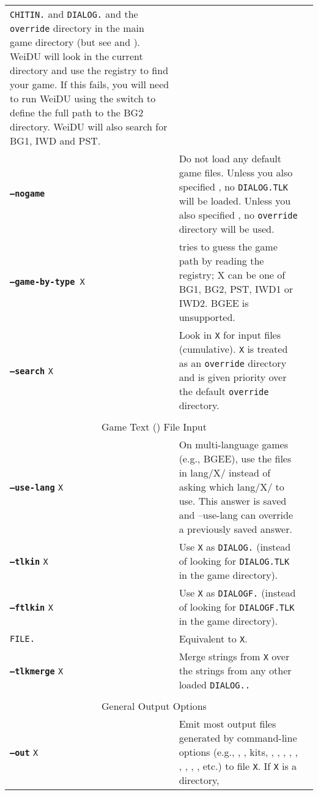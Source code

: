 \documentclass{article}
\def\ttref#1{\ahrefloc{#1}{\tt #1}}
\def\DEFINE#1{{\tt \bf #1}\label{#1}\index{#1}}
\def\t#1{{\tt #1}}
\begin{document}
\begin{tabular}{lp{10in}|p{10in}}
{\tt CHITIN.}\ttref{KEY} and {\tt DIALOG.}\ttref{TLK} and the \t{override}
directory in the main game directory (but see \ttref{--tlkin} and
\ttref{--search}). WeiDU will look in the current directory and use the
registry to find your game. If this fails, you will need to run WeiDU using
the \ttref{--game} switch to define the full path to the BG2 directory.
WeiDU will also search for BG1, IWD and PST. \\
\DEFINE{--nogame}  & Do not
load any default game files. Unless you also specified \ttref{--tlkin}, no
\t{DIALOG.TLK} will be loaded. Unless you also specified \ttref{--search},
no \t{override} directory will be used. \\
{\tt \DEFINE{--game-by-type} X} & tries to guess the game path by reading
the registry; X can be one of BG1, BG2, PST, IWD1 or IWD2. BGEE is unsupported.
\\
\DEFINE{--search} \t{X}	& Look in {\tt X} for input files (cumulative).
\t{X} is treated as an \t{override} directory and is given priority over
the default \t{override} directory. \\
\\
\multicolumn{2}{c}{ \color{red} Game Text (\ttref{TLK}) File Input} \\
\DEFINE{--use-lang} \t{X} & On multi-language games (e.g., BGEE), use the files
in lang/X/ instead of asking which lang/X/ to use. This answer is saved
and --use-lang can override a previously saved answer.\\
\DEFINE{--tlkin} \t{X} & Use {\tt X} as {\tt DIALOG.}\ttref{TLK} (instead
of looking for \t{DIALOG.TLK} in the game directory). \\
\DEFINE{--ftlkin} \t{X} & Use {\tt X} as {\tt DIALOGF.}\ttref{TLK} (instead
of looking for \t{DIALOGF.TLK} in the game directory). \\
\tt{FILE.}\ttref{TLK} & Equivalent to \ttref{--tlkin} \t{X}. \\
\DEFINE{--tlkmerge} \t{X}	& Merge strings from {\tt X} over the strings from any other loaded {\tt \t{DIALOG.}\ttref{TLK}.} \\
\\
\multicolumn{2}{c}{ \color{red} General Output Options} \\
\DEFINE{--out} \t{X} &	Emit most output files generated by command-line
options (e.g., \ttref{D}, \ttref{DLG}, kits, \ttref{--biff-get},
\ttref{BAF}, \ttref{BCS}, \ttref{--automate}, \ttref{--traify-tlk},
\ttref{--extract-kits}, \ttref{--list-biff}, \ttref{--cmp-from},
\ttref{--dcmp-from}, etc.) to file {\tt X}. If \t{X} is a directory,

\end{tabular}
\end{document}

